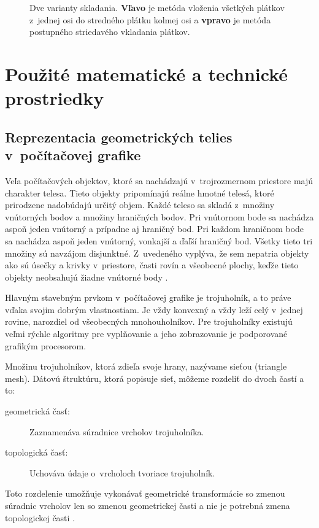 \begin{figure}[H]
\centering
{}\quad
{}
\caption{Dve varianty skladania. \textbf{Vľavo} je metóda vloženia všetkých plátkov z~jednej osi do stredného plátku kolmej osi a \textbf{vpravo} je metóda postupného striedavého vkladania plátkov. }\label{fig:skladanie}
\end{figure}


\chapter{Použité matematické a technické prostriedky}
\section{Reprezentacia geometrických telies v~počítačovej grafike}


Veľa počítačových objektov, ktoré sa nachádzajú v~trojrozmernom priestore majú charakter telesa. Tieto objekty pripomínajú reálne hmotné telesá, ktoré prirodzene nadobúdajú určitý objem.
Každé teleso sa skladá z~množiny vnútorných bodov a množiny hraničných bodov. Pri vnútornom bode sa nachádza aspoň jeden vnútorný a prípadne aj hraničný bod. Pri každom hraničnom bode sa nachádza aspoň jeden vnútorný, vonkajší a ďaľší hraničný bod. Všetky tieto tri množiny sú navzájom disjunktné. 
Z~uvedeného vyplýva, že sem nepatria objekty ako sú úsečky a krivky v~priestore, časti rovín a všeobecné plochy, keďže tieto objekty neobsahujú žiadne vnútorné body \cite{modernipocitacovagrafika}.

Hlavným stavebným prvkom v~počítačovej grafike je trojuholník, a to práve vďaka svojim dobrým vlastnostiam. Je vždy konvexný a vždy leží celý v~jednej rovine, narozdiel od všeobecných mnohouholníkov. Pre trojuholníky existujú veľmi rýchle algoritmy pre vyplňovanie a jeho zobrazovanie je podporované grafikým procesorom.

Množinu trojuholníkov, ktorá zdieľa svoje hrany, nazývame sieťou (triangle mesh). Dátovú štruktúru, ktorá popisuje sieť, môžeme rozdeliť  do dvoch častí a to:
\begin{description}
\item[geometrická časť:] Zaznamenáva súradnice vrcholov trojuholníka.
\item[topologická časť:] Uchováva údaje o~vrcholoch tvoriace trojuholník. 
\end{description}
Toto rozdelenie umožňuje vykonávať geometrické transformácie so zmenou súradnic vrcholov len so zmenou geometrickej časti a nie je potrebná zmena topologickej časti \cite{modernipocitacovagrafika}.

